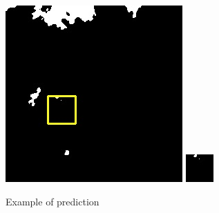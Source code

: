 \documentclass[UTF8]{ctexart}
\begin{document}
\begin{figure}[H]
{\begin{minipage}[b]{0.15\linewidth}
            \vspace{4pt}
            \includegraphics[width=1\linewidth]{../log/cut/LC81620432014072LGN00_16101_unet.jpg}\vspace{4pt}
            \includegraphics[width=1\linewidth]{../log/cut/tmp_cut_LC81620432014072LGN00_16101_unet.jpg}
        \end{minipage}
    }
\caption{Example of prediction}
\label{Fig.main1}
\end{figure}
\end{document}
